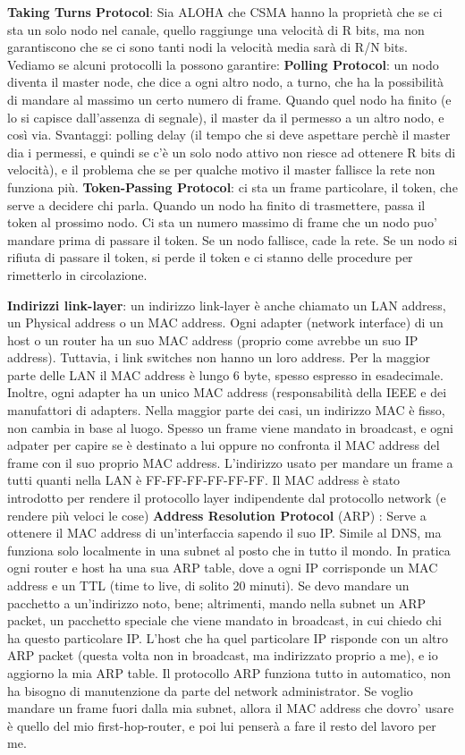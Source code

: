 \documentclass[a4paper,10pt]{article} %
\renewcommand{\b}[1]{%
    {\textbf{#1}}}
\begin{document}
\b{Taking Turns Protocol}: Sia ALOHA che CSMA hanno la proprietà che se ci sta un solo nodo nel canale, quello raggiunge una velocità di R bits, ma non garantiscono che se ci sono tanti nodi la velocità media sarà di R/N bits. Vediamo se alcuni protocolli la possono garantire: \b{Polling Protocol}: un nodo diventa il master node, che dice a ogni altro nodo, a turno, che ha la possibilità di mandare al massimo un certo numero di frame. Quando quel nodo ha finito (e lo si capisce dall'assenza di segnale), il master da il permesso a un altro nodo, e così via. Svantaggi: polling delay (il tempo che si deve aspettare perchè il master dia i permessi, e quindi se c'è un solo nodo attivo non riesce ad ottenere R bits di velocità), e il problema che se per qualche motivo il master fallisce la rete non funziona più.
\b{Token-Passing Protocol}: ci sta un frame particolare, il token, che serve a decidere chi parla. Quando un nodo ha finito di trasmettere, passa il token al prossimo nodo. Ci sta un numero massimo di frame che un nodo puo' mandare prima di passare il token. Se un nodo fallisce, cade la rete. Se un nodo si rifiuta di passare il token, si perde il token e ci stanno delle procedure per rimetterlo in circolazione.

\b{Indirizzi link-layer}: un indirizzo link-layer è anche chiamato un LAN address, un Physical address o un MAC address. Ogni adapter (network interface) di un host o un router ha un suo MAC address (proprio come avrebbe un suo IP address). Tuttavia, i link switches non hanno un loro address. Per la maggior parte delle LAN il MAC address è lungo 6 byte, spesso espresso in esadecimale. Inoltre, ogni adapter ha un unico MAC address (responsabilità della IEEE e dei manufattori di adapters. Nella maggior parte dei casi, un indirizzo MAC è fisso, non cambia in base al luogo. Spesso un frame viene mandato in broadcast, e ogni adpater per capire se è destinato a lui oppure no confronta il MAC address del frame con il suo proprio MAC address. L'indirizzo usato per mandare un frame a tutti quanti nella LAN è FF-FF-FF-FF-FF-FF. Il MAC address è stato introdotto per rendere il protocollo layer indipendente dal protocollo network (e rendere più veloci le cose)
\b{Address Resolution Protocol} (ARP) : Serve a ottenere il MAC address di un'interfaccia sapendo il suo IP. Simile al DNS, ma funziona solo localmente in una subnet al posto che in tutto il mondo. In pratica ogni router e host ha una sua ARP table, dove a ogni IP corrisponde un MAC address e un TTL (time to live, di solito 20 minuti). Se devo mandare un pacchetto a un'indirizzo noto, bene; altrimenti, mando nella subnet un ARP packet, un pacchetto speciale che viene mandato in broadcast, in cui chiedo chi ha questo particolare IP. L'host che ha quel particolare IP risponde con un altro ARP packet (questa volta non in broadcast, ma indirizzato proprio a me), e io aggiorno la mia ARP table. Il protocollo ARP funziona tutto in automatico, non ha bisogno di manutenzione da parte del network administrator. Se voglio mandare un frame fuori dalla mia subnet, allora il MAC address che dovro' usare è quello del mio first-hop-router, e poi lui penserà a fare il resto del lavoro per me.
\end{document}

